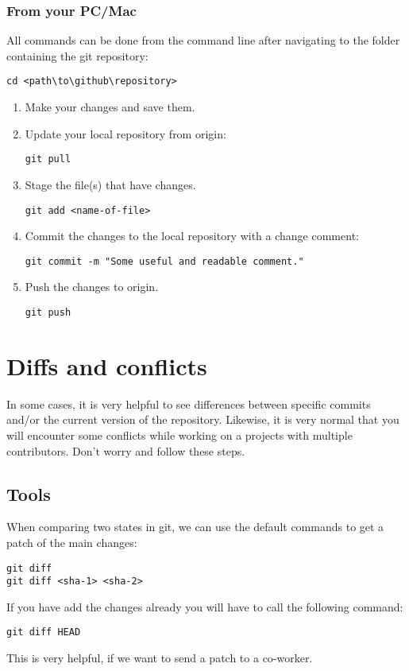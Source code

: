 \documentclass{article}
\begin{document}
\subsubsection{From your PC/Mac}
All commands can be done from the command line after navigating to the folder containing the git repository:
\begin{verbatim}
cd <path\to\github\repository>
\end{verbatim}

\begin{enumerate}
    \item Make your changes and save them.
    \item Update your local repository from origin:
    \begin{verbatim}
git pull   
    \end{verbatim}
    \item Stage the file(s) that have changes.
    \begin{verbatim}
git add <name-of-file>
    \end{verbatim}
    \item Commit the changes to the local repository with a change comment:
    \begin{verbatim}
git commit -m "Some useful and readable comment."
    \end{verbatim}
    \item Push the changes to origin.
    \begin{verbatim}
git push
    \end{verbatim}
\end{enumerate}

\section{Diffs and conflicts}
In some cases, it is very helpful to see differences between specific commits and/or the current version of the repository.
Likewise, it is very normal that you will encounter some conflicts while working on a projects with multiple contributors. Don't worry and follow these steps.

\subsection{Tools}
When comparing two states in git, we can use the default commands to get a patch of the main changes:
\begin{verbatim}
git diff
git diff <sha-1> <sha-2>
\end{verbatim}
If you have add the changes already you will have to call the following command:
\begin{verbatim}
git diff HEAD
\end{verbatim}
This is very helpful, if we want to send a patch to a co-worker.
\end{document}

